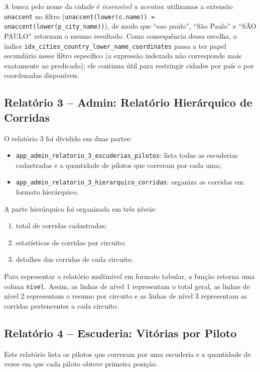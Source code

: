 \documentclass[12pt,a4paper]{article}
\begin{document}
A busca pelo nome da cidade é \emph{insensível a acentos}: utilizamos a extensão \texttt{unaccent} no filtro (\texttt{unaccent(lower(c.name)) = unaccent(lower(p\_city\_name))}), de modo que ``sao paulo'', ``São Paulo'' e ``SÃO PAULO'' retornam o mesmo resultado. Como consequência dessa escolha, o índice \texttt{idx\_cities\_country\_lower\_name\_coordinates} passa a ter papel secundário nesse filtro específico (a expressão indexada não corresponde mais exatamente ao predicado); ele continua útil para restringir cidades por país e por coordenadas disponíveis.

\subsection{Relatório 3 -- Admin: Relatório Hierárquico de Corridas}

O relatório 3 foi dividido em duas partes:

\begin{itemize}
    \item {\small\texttt{app\_admin\_relatorio\_3\_escuderias\_pilotos}}: lista todas as escuderias cadastradas e a quantidade de pilotos que correram por cada uma;
    \item {\small\texttt{app\_admin\_relatorio\_3\_hierarquico\_corridas}}: organiza as corridas em formato hierárquico.
\end{itemize}

A parte hierárquica foi organizada em três níveis:

\begin{enumerate}
    \item total de corridas cadastradas;
    \item estatísticas de corridas por circuito;
    \item detalhes das corridas de cada circuito.
\end{enumerate}

Para representar o relatório multinível em formato tabular, a função retorna uma coluna \texttt{nivel}. Assim, as linhas de nível 1 representam o total geral, as linhas de nível 2 representam o resumo por circuito e as linhas de nível 3 representam as corridas pertencentes a cada circuito.

\subsection{Relatório 4 -- Escuderia: Vitórias por Piloto}

Este relatório lista os pilotos que correram por uma escuderia e a quantidade de vezes em que cada piloto obteve primeira posição.
\end{document}
